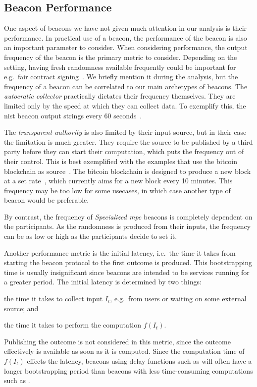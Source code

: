 \subsection{Beacon Performance}
One aspect of beacons we have not given much attention in our analysis is their performance.
In practical use of a beacon, the performance of the beacon is also an important parameter to consider.
When considering performance, the output frequency of the beacon is the primary metric to consider.
Depending on the setting, having fresh randomness available frequently could be important for e.g.\ fair contract signing~\cite{rabin1983transaction}.
We briefly mention it during the analysis, but the frequency of a beacon can be correlated to our main archetypes of beacons.
The \emph{autocratic collector} practically dictates their frequency themselves.
They are limited only by the speed at which they can collect data.
To exemplify this, the \gls{nist} beacon output strings every 60 seconds~\cite{nistbeacon}.

The \emph{transparent authority} is also limited by their input source, but in their case the limitation is much greater.
They require the source to be published by a third party before they can start their computation, which puts the frequency out of their control.
This is best exemplified with the examples that use the bitcoin blockchain as source~\cite{bonneau2015bitcoin, bentov2016bitcoin, bunz2017proofsof}.
The bitcoin blockchain is designed to produce a new block at a set rate~\cite{nakamoto2008bitcoin}, which currently aims for a new block every 10 minutes.
This frequency may be too low for some usecases, in which case another type of beacon would be preferable.

By contrast, the frequency of \emph{Specialized \gls{mpc}} beacons is completely dependent on the participants.
As the randomness is produced from their inputs, the frequency can be as low or high as the participants decide to set it.

Another performance metric is the initial latency, i.e.\ the time it takes from starting the beacon protocol to the first outcome is produced.
This bootstrapping time is usually insignificant since beacons are intended to be services running for a greater period.
The initial latency is determined by two things:
\begin{enumberate*}
    \item the time it takes to collect input $I_t$, e.g.\ from users or waiting on some external source; and
    \item the time it takes to perform the computation $f(I_t)$.
\end{enumberate*}
Publishing the outcome is not considered in this metric, since the outcome effectively is available as soon as it is computed.
Since the computation time of $f(I_t)$ effects the latency, beacons using delay functions such as  will often have a longer bootstrapping period than beacons with less time-consuming computations such as .
